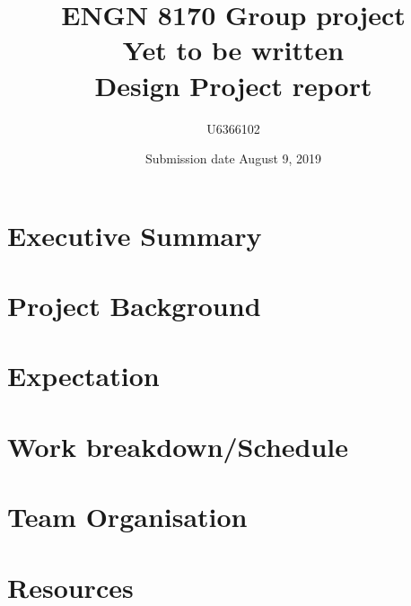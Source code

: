 \documentclass[a4paper]{article}
\title{ENGN 8170 Group project\\ Yet to be written \\ Design Project report}
\author{U6366102}
\date{Submission date August 9, 2019}
\begin{document}
\maketitle
\newpage
\tableofcontents
\newpage
{}
\section{Executive Summary}
\section {Project Background}

\section{Expectation}

\section{Work breakdown/Schedule}

\section{Team Organisation}

\section {Resources}
\end{document}
